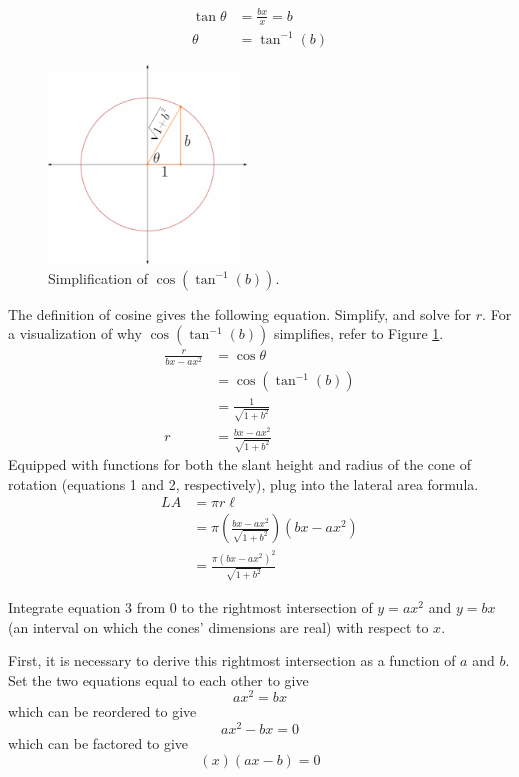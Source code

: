 \documentclass{article}
\begin{document}
\begin{align*}
\tan\theta &=\frac{bx}{x}=b\\
\theta       &= \tan^{-1}\left(b\right)
\end{align*}
\begin{figure}
  \centering
  \includegraphics[width=0.47\textwidth]{Blender/ParabolaLineIntegration-ConeTanTriangle-f2_0001.png}
  \caption{\label{fig:cone3}Simplification of $\cos\left(\tan^{-1}\left(b\right)\right)$.}
\end{figure}
The definition of cosine gives the following equation. Simplify, and solve for $r$. For a visualization of why $\cos\left(\tan^{-1}\left(b\right)\right)$ simplifies, refer to Figure \ref{fig:cone3}.
\begin{align*}
\frac{r}{bx-ax^2} &=\cos\theta\\
                           &=\cos\left(\tan^{-1}\left(b\right)\right)\\
                           &=\frac{1}{\sqrt{1+b^2}}\\
r                          &=\frac{bx-ax^2}{\sqrt{1+b^2}}\tag{2}
\end{align*}
Equipped with functions for both the slant height and radius of the cone of rotation (equations 1 and 2, respectively), plug into the lateral area formula.
\begin{align*}
LA &=\pi r\ell\\
     &=\pi\left(\frac{bx-ax^2}{\sqrt{1+b^2}}\right)\left(bx-ax^2\right)\\
     &=\frac{\pi\left(bx-ax^2\right)^2}{\sqrt{1+b^2}}\tag{3}
\end{align*}\par
Integrate equation 3 from 0 to the rightmost intersection of $y=ax^2$ and $y=bx$ (an interval on which the cones' dimensions are real) with respect to $x$.\par
First, it is necessary to derive this rightmost intersection as a function of $a$ and $b$. Set the two equations equal to each other to give$$ax^2=bx$$which can be reordered to give$$ax^2-bx=0$$which can be factored to give$$\left(x\right)\left(ax-b\right)=0$$\par
\end{document}
